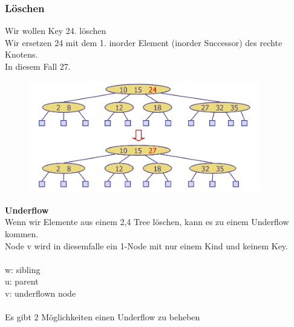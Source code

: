 \documentclass[a4paper,10pt]{report}
\begin{document}
\subsubsection{Löschen}
Wir wollen Key 24. löschen \\
Wir ersetzen 24 mit dem 1. inorder Element (inorder Successor) des rechte Knotens.\\
In diesem Fall 27.
\begin{figure}[H]
	\begin{center}
  		\includegraphics[width=0.9\textwidth]{img/24treedeletion1.png}
	\end{center}
\end{figure}
\newpage
\noindent
\textbf{Underflow}\\
Wenn wir Elemente aus einem 2,4 Tree löschen, kann es zu einem Underflow kommen.\\
Node v wird in diesemfalle ein 1-Node mit nur einem Kind und keinem Key.\\
\\
w: sibling\\
u: parent\\
v: underflown node
\\
\\
Es gibt 2 Möglichkeiten einen Underflow zu beheben
\end{document}
